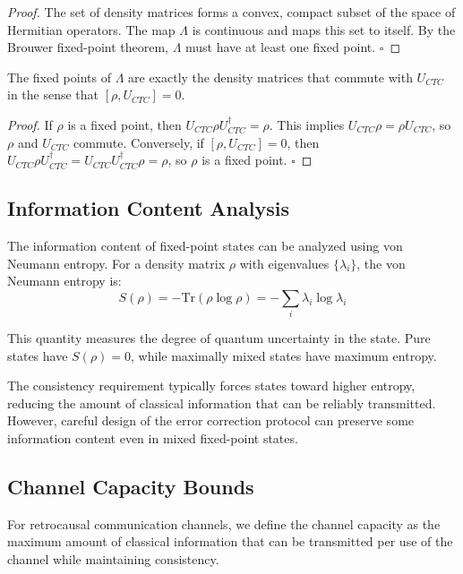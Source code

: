 \documentclass[12pt,a4paper]{article}
\begin{document}
\begin{proof}
The set of density matrices forms a convex, compact subset of the space of Hermitian operators. The map $\Lambda$ is continuous and maps this set to itself. By the Brouwer fixed-point theorem, $\Lambda$ must have at least one fixed point. $\square$
\end{proof}

\begin{theorem}[Characterization]
The fixed points of $\Lambda$ are exactly the density matrices that commute with $U_{CTC}$ in the sense that $[\rho, U_{CTC}] = 0$.
\end{theorem}

\begin{proof}
If $\rho$ is a fixed point, then $U_{CTC} \rho U_{CTC}^\dagger = \rho$. This implies $U_{CTC} \rho = \rho U_{CTC}$, so $\rho$ and $U_{CTC}$ commute. Conversely, if $[\rho, U_{CTC}] = 0$, then $U_{CTC} \rho U_{CTC}^\dagger = U_{CTC} U_{CTC}^\dagger \rho = \rho$, so $\rho$ is a fixed point. $\square$
\end{proof}

\subsection{Information Content Analysis}

The information content of fixed-point states can be analyzed using von Neumann entropy. For a density matrix $\rho$ with eigenvalues $\{\lambda_i\}$, the von Neumann entropy is:
\begin{equation}
S(\rho) = -\text{Tr}(\rho \log \rho) = -\sum_i \lambda_i \log \lambda_i
\end{equation}

This quantity measures the degree of quantum uncertainty in the state. Pure states have $S(\rho) = 0$, while maximally mixed states have maximum entropy.

The consistency requirement typically forces states toward higher entropy, reducing the amount of classical information that can be reliably transmitted. However, careful design of the error correction protocol can preserve some information content even in mixed fixed-point states.

\subsection{Channel Capacity Bounds}

For retrocausal communication channels, we define the channel capacity as the maximum amount of classical information that can be transmitted per use of the channel while maintaining consistency.
\end{document}
